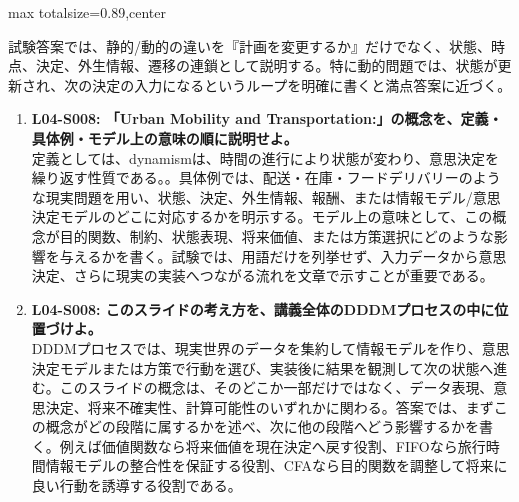 \begin{minipage}[t]{0.58\textwidth}
\begin{adjustbox}{max totalsize={\textwidth}{0.89\textheight},center}
\begin{minipage}{\textwidth}
試験答案では、静的/動的の違いを『計画を変更するか』だけでなく、状態、時点、決定、外生情報、遷移の連鎖として説明する。特に動的問題では、状態が更新され、次の決定の入力になるというループを明確に書くと満点答案に近づく。\par{}\begin{enumerate}\item \textbf{L04-S008: 「Urban Mobility and Transportation:」の概念を、定義・具体例・モデル上の意味の順に説明せよ。}\\定義としては、dynamismは、時間の進行により状態が変わり、意思決定を繰り返す性質である。。具体例では、配送・在庫・フードデリバリーのような現実問題を用い、状態、決定、外生情報、報酬、または情報モデル/意思決定モデルのどこに対応するかを明示する。モデル上の意味として、この概念が目的関数、制約、状態表現、将来価値、または方策選択にどのような影響を与えるかを書く。試験では、用語だけを列挙せず、入力データから意思決定、さらに現実の実装へつながる流れを文章で示すことが重要である。\item \textbf{L04-S008: このスライドの考え方を、講義全体のDDDMプロセスの中に位置づけよ。}\\DDDMプロセスでは、現実世界のデータを集約して情報モデルを作り、意思決定モデルまたは方策で行動を選び、実装後に結果を観測して次の状態へ進む。このスライドの概念は、そのどこか一部だけではなく、データ表現、意思決定、将来不確実性、計算可能性のいずれかに関わる。答案では、まずこの概念がどの段階に属するかを述べ、次に他の段階へどう影響するかを書く。例えば価値関数なら将来価値を現在決定へ戻す役割、FIFOなら旅行時間情報モデルの整合性を保証する役割、CFAなら目的関数を調整して将来に良い行動を誘導する役割である。\end{enumerate}
\end{minipage}
\end{adjustbox}
\end{minipage}


